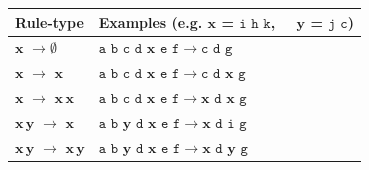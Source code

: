  \begin{table}[!ht] %
\small
\centering
\begin{tabular}{l|l}
\toprule
 Rule-type& {Examples (e.g. $\mathbf{x}$ = $\texttt{i h k}$,~~ $\mathbf{y}$ = $\texttt{j c}$)} \\
\midrule
$\mathbf{x}$ $\rightarrow \emptyset$ 
& $\texttt{a b c d }\mathbf{x} \texttt{ e f} \rightarrow \texttt{c d g}$\\
\cmidrule{1-2}
$\mathbf{x}$ $\rightarrow$ $\mathbf{x}$ 
& $\texttt{a b c d }\mathbf{x} \texttt{ e f} \rightarrow \texttt{c d } \mathbf{x} \texttt{ g} $\\
$\mathbf{x}$ $\rightarrow$ $\mathbf{x\,x}$ 
& $\texttt{a b c d }\mathbf{x} \texttt{ e f} \rightarrow \mathbf{x}  \texttt{ d } \mathbf{x} \texttt{ g} $\\
$\mathbf{x\,y}$ $\rightarrow$ $\mathbf{x}$ 
& $\texttt{a b } \mathbf{y} \texttt{ d }\mathbf{x} \texttt{ e f} \rightarrow \mathbf{x}  \texttt{ d i g} $\\
$\mathbf{x\,y}$ $\rightarrow$ $\mathbf{x\,y}$ 
& $\texttt{a b } \mathbf{y} \texttt{ d }\mathbf{x} \texttt{ e f} \rightarrow \mathbf{x}  \texttt{ d } \mathbf{y} \texttt{ g} $\\
\bottomrule
\end{tabular} \vspace{-5pt}
\end{table} \vspace{-2pt}\\ \vspace{-15pt}\\%
